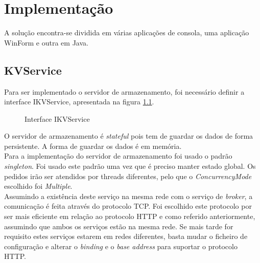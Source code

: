 \chapter{Implementação}

A solução encontra-se dividida em várias aplicações de consola, uma aplicação WinForm e outra em Java. 

\section{KVService} \label{kvservice}

Para ser implementado o servidor de armazenamento, foi necessário definir a interface IKVService, apresentada na figura \ref{ikvservice}.\\ 

\begin{figure}[h]
	\caption{Interface IKVService}
	\label{ikvservice}
\end{figure}

O servidor de armazenamento é \textit{stateful} pois tem de guardar os dados de forma persistente. A forma de guardar os dados é em memória.\\
Para a implementação do servidor de armazenamento foi usado o padrão \textit{singleton}. Foi usado este padrão uma vez que é preciso manter estado global.
Os pedidos irão ser atendidos por threads diferentes, pelo que o \textit{ConcurrencyMode} escolhido foi \textit{Multiple}.\\
Assumindo a existência deste serviço na mesma rede com o serviço de \textit{broker}, a comunicação é feita através do protocolo TCP. Foi escolhido este protocolo por ser mais eficiente em relação ao protocolo HTTP e como referido anteriormente, assumindo que ambos os serviços estão na mesma rede. Se mais tarde for requisito estes serviços estarem em redes diferentes, basta mudar o ficheiro de configuração e alterar o \textit{binding} e o \textit{base address} para suportar o protocolo HTTP.

